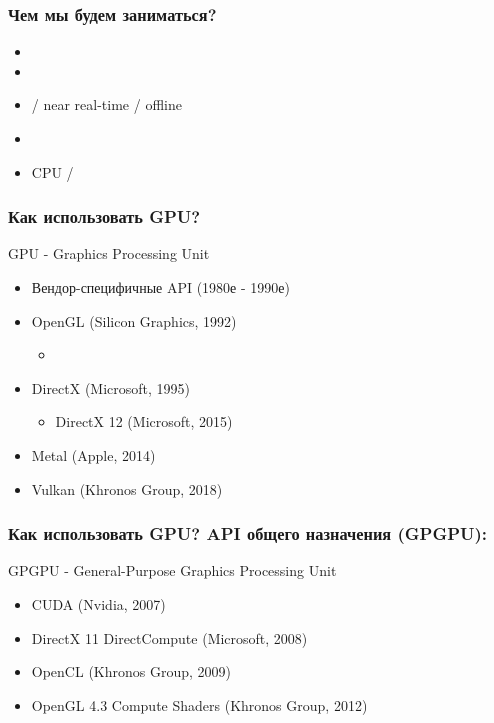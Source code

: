 \documentclass{beamer}
\begin{document}
\begin{frame}
\frametitle{Чем мы будем заниматься?}
\begin{itemize}
\item {}
\item {}
\item {} / near real-time / offline
\item {}
\item CPU / 
\end{itemize}
\end{frame}

\begin{frame}
\frametitle{Как использовать GPU? }
GPU - Graphics Processing Unit
\pause
\pause
\begin{itemize}
\item Вендор-специфичные API (1980е - 1990е)
\pause
\item OpenGL (Silicon Graphics, 1992)
\pause
\begin{itemize}
\item {}
\end{itemize}
\pause
\item DirectX (Microsoft, 1995)
\pause
\begin{itemize}
\item {DirectX 12 (Microsoft, 2015)}
\end{itemize}
\pause
\item {\only<10->{\color{red}}Metal (Apple, 2014)}
\pause
\item {Vulkan (Khronos Group, 2018)}
\end{itemize}
\end{frame}

\begin{frame}
\frametitle{Как использовать GPU? API общего назначения (GPGPU):}
GPGPU - General-Purpose Graphics Processing Unit
\pause
\begin{itemize}
\item CUDA (Nvidia, 2007)
\pause
\item DirectX 11 DirectCompute (Microsoft, 2008)
\pause
\item OpenCL (Khronos Group, 2009)
\pause
\item OpenGL 4.3 Compute Shaders (Khronos Group, 2012)
\end{itemize}
\end{frame}
\end{document}

